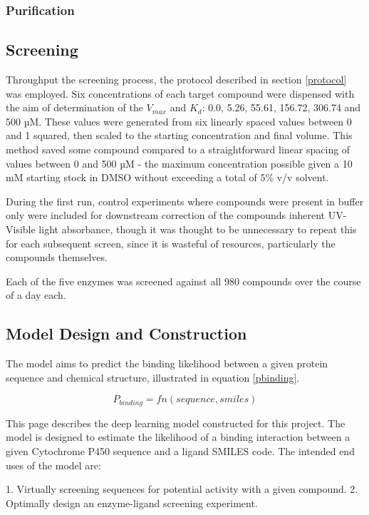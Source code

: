 \documentclass{article}
\begin{document}
\subsubsection{Purification}

\subsection{Screening}

Throughput the screening process, the protocol described in section \ref{protocol} was employed.
Six concentrations of each target compound were dispensed with the aim of determination of the $V_{max}$ and $K_d$: 0.0, 5.26, 55.61, 156.72, 306.74 and 500 µM.
These values were generated from six linearly spaced values between 0 and 1 squared, then scaled to the starting concentration and final volume.
This method saved some compound compared to a straightforward linear spacing of values between 0 and 500 µM - the maximum concentration possible given a 10 mM starting stock in DMSO without exceeding a total of 5\% v/v solvent.
\par
During the first run, control experiments where compounds were present in buffer only were included for downstream correction of the compounds inherent UV-Visible light absorbance, though it was thought to be unnecessary to repeat this for each subsequent screen, since it is wasteful of resources, particularly the compounds themselves.

Each of the five enzymes was screened against all 980 compounds over the course of a day each.




\subsection{Model Design and Construction}

The model aims to predict the binding likelihood between a given protein sequence and chemical structure, illustrated in equation \ref{pbinding}.

$$
\label{pbinding}
P_{binding} = fn(sequence, smiles)
$$

This page describes the deep learning model constructed for this project.
The model is designed to estimate the likelihood of a binding interaction between a given Cytochrome P450 sequence and a ligand SMILES code.
The intended end uses of the model are:

1. Virtually screening sequences for potential activity with a given compound.
2. Optimally design an enzyme-ligand screening experiment.
\end{document}
